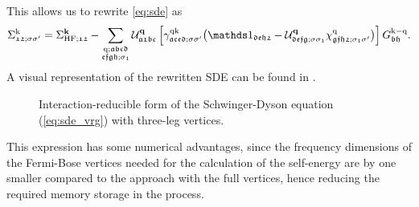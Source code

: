 \documentclass[../../main.tex]{subfiles}
\begin{document}
This allows us to rewrite \eqref{eq:sde} as
\begin{align}\label{eq:sde_vrg}
	\Sigma_{\mathfrak{12};\ss'}^{\k}=\Sigma_{\text{HF};\mathfrak{12}}^{\vv{k}}-\sum_{\substack{\q;\mathfrak{abcd}\\\mathfrak{efgh};\sigma_1}}\mathcal{U}^{\vv{q}}_{\mathfrak{a1bc}}\left [\gamma_{\mathfrak{aced};\ss'}^{\q\k}\big (\unity_{\mathfrak{deh2}}-\mathcal{U}^{\vv{q}}_{\mathfrak{defg};\ss_1}\chi_{\mathfrak{gfh2};\sigma_1\sigma'}^{\q}\big)\right ]G_{\mathfrak{bh}}^{\k-\q}.
\end{align}
A visual representation of the rewritten SDE can be found in . 
\begin{figure}[ht!]
	\centering
  	
  	\caption{Interaction-reducible form of the Schwinger-Dyson equation (\ref{eq:sde_vrg}) with three-leg vertices.}
  	\label{fig:sde_vrg}
\end{figure}
This expression has some numerical advantages, since the frequency dimensions of the Fermi-Bose vertices needed for the calculation of the self-energy are by one smaller compared to the approach with the full vertices, hence reducing the required memory storage in the process. 
\\\\
\end{document}
